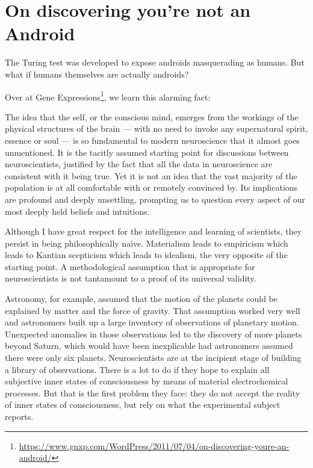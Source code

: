 \section{On discovering you're not an Android}

\begin{quotex}
The Turing test was developed to expose androids masquerading as humans. But what if humans themselves are actually androids? 
\end{quotex}

Over at Gene Expressions\footnote{\url{https://www.gnxp.com/WordPress/2011/07/04/on-discovering-youre-an-android/}}, we learn this alarming fact:

\begin{quotex}
The idea that the self, or the conscious mind, emerges from the workings of the physical structures of the brain — with no need to invoke any supernatural spirit, essence or soul — is so fundamental to modern neuroscience that it almost goes unmentioned. It is the tacitly assumed starting point for discussions between neuroscientists, justified by the fact that all the data in neuroscience are consistent with it being true. Yet it is not an idea that the vast majority of the population is at all comfortable with or remotely convinced by. Its implications are profound and deeply unsettling, prompting us to question every aspect of our most deeply held beliefs and intuitions.

\end{quotex}
Although I have great respect for the intelligence and learning of scientists, they persist in being philosophically naive. Materialism leads to empiricism which leads to Kantian scepticism which leads to idealism, the very opposite of the starting point. A methodological assumption that is appropriate for neuroscientists is not tantamount to a proof of its universal validity.

Astronomy, for example, assumed that the motion of the planets could be explained by matter and the force of gravity. That assumption worked very well and astronomers built up a large inventory of observations of planetary motion. Unexpected anomalies in those observations led to the discovery of more planets beyond Saturn, which would have been inexplicable had astronomers assumed there were only six planets. Neuroscientists are at the incipient stage of building a library of observations. There is a lot to do if they hope to explain all subjective inner states of consciousness by means of material electrochemical processes. But that is the first problem they face: they do not accept the reality of inner states of consciousness, but rely on what the experimental subject reports.

